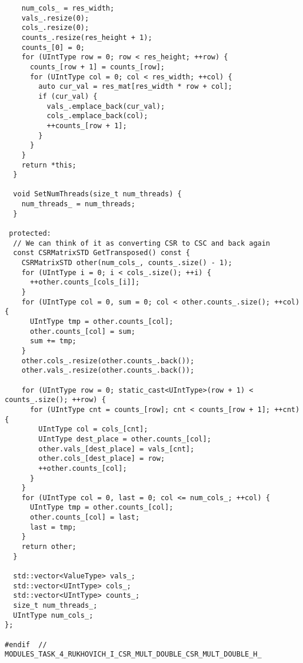 \documentclass{report}
\begin{document}
\begin{lstlisting}
    num_cols_ = res_width;
    vals_.resize(0);
    cols_.resize(0);
    counts_.resize(res_height + 1);
    counts_[0] = 0;
    for (UIntType row = 0; row < res_height; ++row) {
      counts_[row + 1] = counts_[row];
      for (UIntType col = 0; col < res_width; ++col) {
        auto cur_val = res_mat[res_width * row + col];
        if (cur_val) {
          vals_.emplace_back(cur_val);
          cols_.emplace_back(col);
          ++counts_[row + 1];
        }
      }
    }
    return *this;
  }

  void SetNumThreads(size_t num_threads) {
    num_threads_ = num_threads;
  }

 protected:
  // We can think of it as converting CSR to CSC and back again
  const CSRMatrixSTD GetTransposed() const {
    CSRMatrixSTD other(num_cols_, counts_.size() - 1);
    for (UIntType i = 0; i < cols_.size(); ++i) {
      ++other.counts_[cols_[i]];
    }
    for (UIntType col = 0, sum = 0; col < other.counts_.size(); ++col) {
      UIntType tmp = other.counts_[col];
      other.counts_[col] = sum;
      sum += tmp;
    }
    other.cols_.resize(other.counts_.back());
    other.vals_.resize(other.counts_.back());

    for (UIntType row = 0; static_cast<UIntType>(row + 1) < counts_.size(); ++row) {
      for (UIntType cnt = counts_[row]; cnt < counts_[row + 1]; ++cnt) {
        UIntType col = cols_[cnt];
        UIntType dest_place = other.counts_[col];
        other.vals_[dest_place] = vals_[cnt];
        other.cols_[dest_place] = row;
        ++other.counts_[col];
      }
    }
    for (UIntType col = 0, last = 0; col <= num_cols_; ++col) {
      UIntType tmp = other.counts_[col];
      other.counts_[col] = last;
      last = tmp;
    }
    return other;
  }

  std::vector<ValueType> vals_;
  std::vector<UIntType> cols_;
  std::vector<UIntType> counts_;
  size_t num_threads_;
  UIntType num_cols_;
};

#endif  // MODULES_TASK_4_RUKHOVICH_I_CSR_MULT_DOUBLE_CSR_MULT_DOUBLE_H_
\end{lstlisting}
\end{document}
